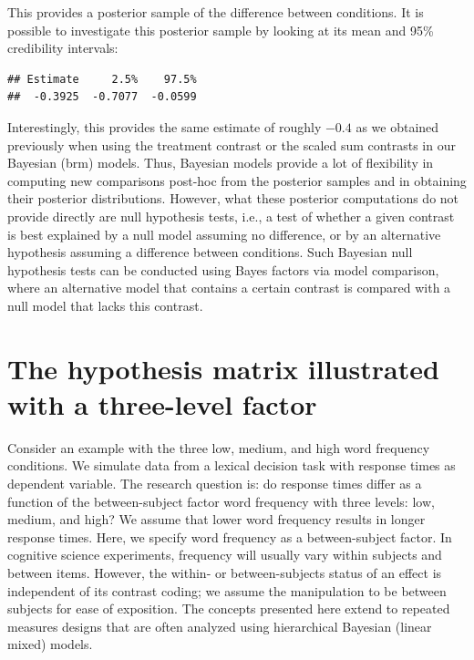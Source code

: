 \documentclass[12pt,]{krantz}
\newenvironment{Shaded}{\begin{snugshade}}{\end{snugshade}}
\newcommand{\DataTypeTok}[1]{\textcolor[rgb]{0.13,0.29,0.53}{#1}}
\newcommand{\FloatTok}[1]{\textcolor[rgb]{0.00,0.00,0.81}{#1}}
\newcommand{\KeywordTok}[1]{\textcolor[rgb]{0.13,0.29,0.53}{\textbf{#1}}}
\newcommand{\NormalTok}[1]{#1}
\newcommand{\OperatorTok}[1]{\textcolor[rgb]{0.81,0.36,0.00}{\textbf{#1}}}
\theoremstyle{definition}
\theoremstyle{definition}
\theoremstyle{definition}
\theoremstyle{remark}
\begin{document}
This provides a posterior sample of the difference between conditions. It is possible to investigate this posterior sample by looking at its mean and 95\% credibility intervals:

\begin{Shaded}
\end{Shaded}

\begin{verbatim}
## Estimate     2.5%    97.5% 
##  -0.3925  -0.7077  -0.0599
\end{verbatim}

Interestingly, this provides the same estimate of roughly \(-0.4\) as we obtained previously when using the treatment contrast or the scaled sum contrasts in our Bayesian (brm) models.
Thus, Bayesian models provide a lot of flexibility in computing new comparisons post-hoc from the posterior samples and in obtaining their posterior distributions. However, what these posterior computations do not provide directly are null hypothesis tests, i.e., a test of whether a given contrast is best explained by a null model assuming no difference, or by an alternative hypothesis assuming a difference between conditions. Such Bayesian null hypothesis tests can be conducted using Bayes factors via model comparison, where an alternative model that contains a certain contrast is compared with a null model that lacks this contrast.

\hypertarget{the-hypothesis-matrix-illustrated-with-a-three-level-factor}{%
\section{The hypothesis matrix illustrated with a three-level factor}\label{the-hypothesis-matrix-illustrated-with-a-three-level-factor}}

Consider an example with the three low, medium, and high word frequency conditions. We simulate data from a lexical decision task with response times as dependent variable. The research question is: do response times differ as a function of the between-subject factor word frequency with three levels: low, medium, and high? We assume that lower word frequency results in longer response times. Here, we specify word frequency as a between-subject factor. In cognitive science experiments, frequency will usually vary within subjects and between items. However, the within- or between-subjects status of an effect is independent of its contrast coding; we assume the manipulation to be between subjects for ease of exposition. The concepts presented here extend to repeated measures designs that are often analyzed using hierarchical Bayesian (linear mixed) models.
\end{document}
